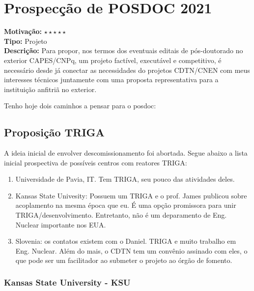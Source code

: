 \chapter{Prospecção de POSDOC 2021}
\label{posdoc}

\textbf{Motivação:} $\star\star\star\star\star$\\

\textbf{Tipo:} Projeto\\

\textbf{Descrição:} Para propor, nos termos dos eventuais editais de pós-doutorado no exterior CAPES/CNPq, um projeto factível, executável e competitivo, é necessário 
desde já conectar as necessidades do projetos CDTN/CNEN com meus interesses técnicos juntamente com uma proposta representativa para a instituição anfitriã 
no exterior.

Tenho hoje dois caminhos a pensar para o posdoc:

\section{Proposição TRIGA}
 
A ideia inicial de envolver descomissionamento foi abortada. Segue abaixo a lista inicial prospectiva de possíveis centros com reatores TRIGA:
 \begin{enumerate}
 	\item Universidade de Pavia, IT. Tem TRIGA, seu pouco das atividades deles.
 	\item Kansas State Univesity: Possuem um TRIGA e o prof. James publicou sobre acoplamento na mesma época que eu. É uma opção promissora para unir TRIGA/desenvolvimento. Entretanto, não é um deparamento de Eng. Nuclear importante nos EUA.
 	\item Slovenia: os contatos existem com o Daniel. TRIGA e muito trabalho em Eng. Nuclear. Além do mais, o CDTN tem um convênio assinado com eles, o que pode 
 	ser um facilitador ao submeter o projeto ao órgão de fomento.
 \end{enumerate}

\subsection{Kansas State University - KSU}

